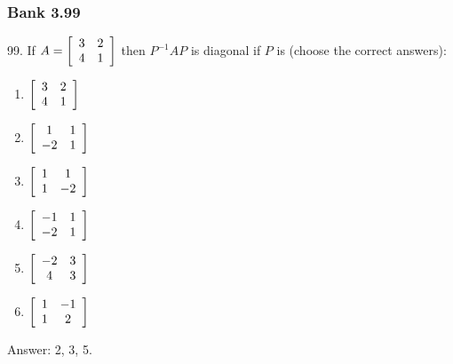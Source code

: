 \documentclass[pdf,9pt,t]{beamer}
\begin{document}
\begin{frame}[fragile]
    \frametitle{Bank 3.99}
    \begin{problem}
	99. If $A=\left[
	    \begin{array}[c]{cc}
		3 &  2\\
		4 &  1
	    \end{array}
	    \right]$ then $P^{-1}AP$ is diagonal if $P$ is (choose the correct answers):
	\begin{enumerate}
		\item $\left[
		\begin{array}[c]{cc}
		    3 &  2\\
		    4 &  1
		\end{array}
		\right]$
	    \item $\left[
		\begin{array}[c]{cc}
		    1  &  1\\
		    -2 &  1
		\end{array}
		\right]$
	    \item $\left[
		\begin{array}[c]{cc}
		    1 &  1\\
		    1 &  -2
		\end{array}
		\right]$
	    \item $\left[
		\begin{array}[c]{cc}
		    -1  &  1\\
		    -2 &  1
		\end{array}
		\right]$
	    \item $\left[
		\begin{array}[c]{cc}
		    -2 &  3\\
		    4  &  3
		\end{array}
		\right]$
	    \item $\left[
		\begin{array}[c]{cc}
		    1 &  -1\\
		    1 &  2
		\end{array}
		\right]$
	\end{enumerate}
    \end{problem}
    \pause
    Answer: 2, 3, 5.
\end{frame}
\end{document}
